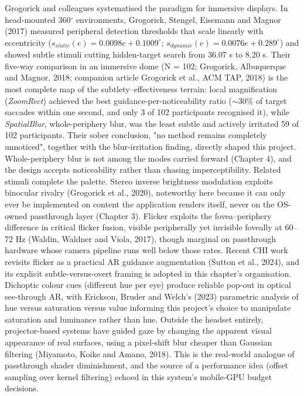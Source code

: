 Grogorick and colleagues systematised the paradigm for immersive displays. In head-mounted 360$^{\circ}$
environments, Grogorick, Stengel, Eisemann and Magnor (2017) measured peripheral detection thresholds
that scale linearly with eccentricity ($s_{static}(e) = 0.0098e + 0.1009^{\circ}$; $s_{dynamic}(e) = 0.0076e
+ 0.289^{\circ}$) and showed subtle stimuli cutting hidden-target search from 36.07 s to 8.20 s. Their
five-way comparison in an immersive dome (N = 102; Grogorick, Albuquerque and Magnor, 2018; companion
article Grogorick et al., ACM TAP, 2018) is the most complete map of the subtlety–effectiveness
terrain: local magnification (\textit{ZoomRect}) achieved the best guidance-per-noticeability ratio
($\sim$30\% of target saccades within one second, and only 3 of 102 participants recognised it), while
\textit{SpatialBlur}, whole-periphery blur, was the least subtle and actively irritated 59 of 102
participants. Their sober conclusion, "no method remains completely unnoticed", together with the
blur-irritation finding, directly shaped this project. Whole-periphery blur is not among the modes
carried forward (Chapter 4), and the design accepts noticeability rather than chasing
imperceptibility. Related stimuli complete the palette. Stereo inverse brightness modulation
exploits binocular rivalry (Grogorick et al., 2020), noteworthy here because it can only ever be
implemented on content the application renders itself, never on the OS-owned passthrough layer
(Chapter 3). Flicker exploits the fovea–periphery difference in critical flicker fusion, visible
peripherally yet invisible foveally at 60–72 Hz (Waldin, Waldner and Viola, 2017), though marginal on
passthrough hardware whose camera pipeline runs well below those rates. Recent CHI work revisits
flicker as a practical AR guidance augmentation (Sutton et al., 2024), and its explicit
subtle-versus-overt framing is adopted in this chapter's organisation. Dichoptic colour cues
(different hue per eye) produce reliable pop-out in optical see-through AR, with Erickson, Bruder
and Welch's (2023) parametric
analysis of hue versus saturation versus value informing this project's choice to manipulate saturation
and luminance rather than hue. Outside the headset entirely, projector-based systems have guided gaze by
changing the apparent visual appearance of real surfaces, using a pixel-shift blur cheaper than
Gaussian filtering (Miyamoto, Koike and Amano, 2018). This is the
real-world analogue of passthrough shader diminishment, and the source of a performance idea (offset
sampling over kernel filtering) echoed in this system's mobile-GPU budget decisions.

